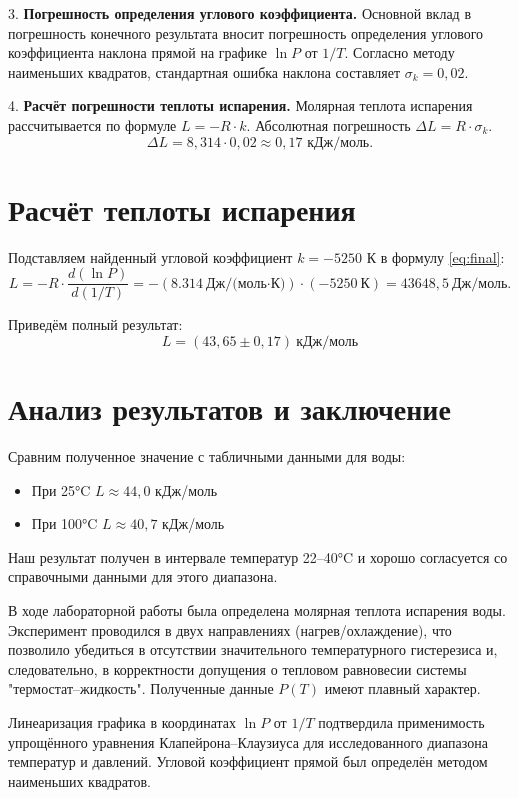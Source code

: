 \documentclass{article}
\begin{document}
	3.  \textbf{Погрешность определения углового коэффициента.} Основной вклад в погрешность конечного результата вносит погрешность определения углового коэффициента наклона прямой на графике \(\ln P\) от \(1/T\). Согласно методу наименьших квадратов, стандартная ошибка наклона составляет \(\sigma_k = 0,02\).
	
	4.  \textbf{Расчёт погрешности теплоты испарения.}
	Молярная теплота испарения рассчитывается по формуле \(L = -R \cdot k\). Абсолютная погрешность \(\Delta L = R \cdot \sigma_k\).
	\[
	\Delta L = 8,314 \cdot 0,02 \approx 0,17 \text{ кДж/моль}.
	\]
	
	\section*{Расчёт теплоты испарения}
	Подставляем найденный угловой коэффициент \(k = -5250\) К в формулу \eqref{eq:final}:
	\[
	L = -R \cdot \frac{d(\ln P)}{d(1/T)} = - (8.314 \ \text{Дж/(моль·К)}) \cdot (-5250 \ \text{К}) = 43648,5 \ \text{Дж/моль}.
	\]
	
	Приведём полный результат:
	\[
	\boxed{L = (43,65 \pm 0,17) \ \text{кДж/моль}}
	\]
	

	
\section*{Анализ результатов и заключение}
	\hspace{4mm}Сравним полученное значение с табличными данными для воды:
	\begin{itemize}
		\item При 25°C \(L \approx 44,0\) кДж/моль
		\item При 100°C \(L \approx 40,7\) кДж/моль
	\end{itemize}
	
	Наш результат получен в интервале температур 22–40°C и хорошо согласуется со справочными данными для этого диапазона.
	
	 В ходе лабораторной работы была определена молярная теплота испарения воды. Эксперимент проводился в двух направлениях (нагрев/охлаждение), что позволило убедиться в отсутствии значительного температурного гистерезиса и, следовательно, в корректности допущения о тепловом равновесии системы "термостат–жидкость". Полученные данные \(P(T)\) имеют плавный характер.
	
	Линеаризация графика в координатах \(\ln P\) от \(1/T\) подтвердила применимость упрощённого уравнения Клапейрона–Клаузиуса для исследованного диапазона температур и давлений. Угловой коэффициент прямой был определён методом наименьших квадратов.
	
\end{document}
